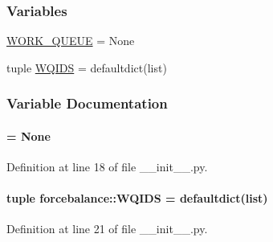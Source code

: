 \subsubsection*{\-Variables}
\begin{DoxyCompactItemize}
\item 
\hyperlink{namespaceforcebalance_a9cf7d53eb5cdb4db2b876eb59ba83075}{\-W\-O\-R\-K\-\_\-\-Q\-U\-E\-U\-E} = \-None
\item 
tuple \hyperlink{namespaceforcebalance_a77a3598d98b784c79e15e9fef3a1c72c}{\-W\-Q\-I\-D\-S} = defaultdict(list)
\end{DoxyCompactItemize}


\subsubsection{\-Variable \-Documentation}
\hypertarget{namespaceforcebalance_a9cf7d53eb5cdb4db2b876eb59ba83075}{
\paragraph[{\-W\-O\-R\-K\-\_\-\-Q\-U\-E\-U\-E}]{ = \-None}}\label{namespaceforcebalance_a9cf7d53eb5cdb4db2b876eb59ba83075}


\-Definition at line 18 of file \-\_\-\-\_\-init\-\_\-\-\_\-.\-py.

\hypertarget{namespaceforcebalance_a77a3598d98b784c79e15e9fef3a1c72c}{
\paragraph[{\-W\-Q\-I\-D\-S}]{\setlength{\rightskip}{0pt plus 5cm}tuple {\bf forcebalance\-::\-W\-Q\-I\-D\-S} = defaultdict(list)}}\label{namespaceforcebalance_a77a3598d98b784c79e15e9fef3a1c72c}


\-Definition at line 21 of file \-\_\-\-\_\-init\-\_\-\-\_\-.\-py.

